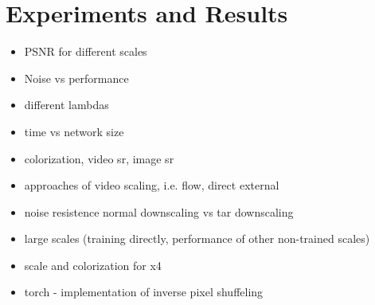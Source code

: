 \newpage
\section{Experiments and Results}
\label{sec:ExperimentsandResults}



\begin{itemize}
  \item PSNR for different scales
  \item Noise vs performance
  \item different lambdas 
  \item time vs network size
  \item colorization, video sr, image sr
  \item approaches of video scaling, i.e. flow, direct external
  \item noise resistence normal downscaling vs tar downscaling
  \item large scales (training directly, performance of other non-trained scales)
  \item scale and colorization for x4
\end{itemize}


\begin{itemize}
  \item torch - implementation of inverse pixel shuffeling
\end{itemize}

